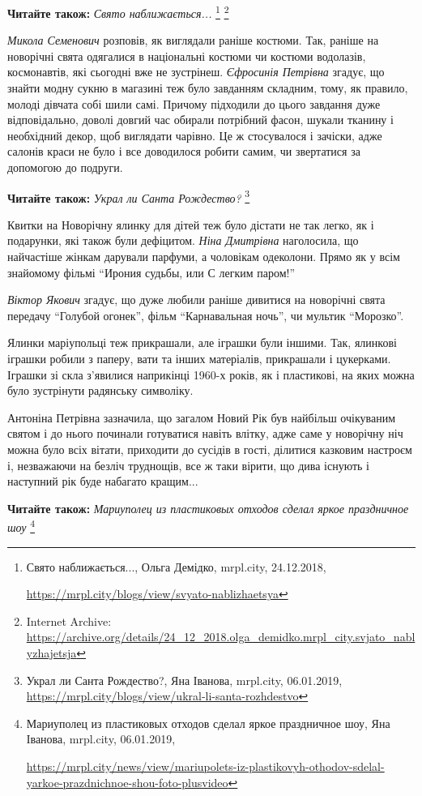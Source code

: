 
\textbf{Читайте також:} \emph{Свято наближається...}%
\footnote{Свято наближається..., Ольга Демідко, mrpl.city, 24.12.2018, \par%
\url{https://mrpl.city/blogs/view/svyato-nablizhaetsya}
} %
\footnote{Internet Archive: \url{https://archive.org/details/24_12_2018.olga_demidko.mrpl_city.svjato_nablyzhajetsja}}


\emph{Микола Семенович} розповів, як виглядали раніше костюми. Так, раніше на
новорічні свята одягалися в національні костюми чи костюми водолазів,
космонавтів, які сьогодні вже не зустрінеш. \emph{Єфросинія Петрівна} згадує, що
знайти модну сукню в магазині теж було завданням складним, тому, як правило,
молоді дівчата собі шили самі. Причому підходили до цього завдання дуже
відповідально, доволі довгий час обирали потрібний фасон, шукали тканину і
необхідний декор, щоб виглядати чарівно. Це ж стосувалося і зачіски, адже
салонів краси не було і все доводилося робити самим, чи звертатися за допомогою
до подруги.

\textbf{Читайте також:} \emph{Украл ли Санта Рождество?}%
\footnote{Украл ли Санта Рождество?, Яна Іванова, mrpl.city, 06.01.2019, \url{https://mrpl.city/blogs/view/ukral-li-santa-rozhdestvo}}

Квитки на Новорічну ялинку для дітей теж було дістати не так легко, як і
подарунки, які також були дефіцитом. \emph{Ніна Дмитрівна} наголосила, що найчастіше
жінкам дарували парфуми, а чоловікам одеколони. Прямо як у всім знайомому
фільмі \enquote{Ирония судьбы, или С легким паром!} 


\emph{Віктор Якович} згадує, що дуже любили раніше дивитися на новорічні свята
передачу \enquote{Голубой огонек}, фільм \enquote{Карнавальная ночь}, чи мультик \enquote{Морозко}.

Ялинки маріупольці теж прикрашали, але іграшки були іншими. Так, ялинкові
іграшки робили з паперу, вати та інших матеріалів, прикрашали і цукерками.
Іграшки зі скла з'явилися наприкінці 1960-х років, як і пластикові, на яких
можна було зустрінути радянську символіку.

Антоніна Петрівна зазначила, що загалом Новий Рік був найбільш очікуваним
святом і до нього починали готуватися навіть влітку, адже саме у новорічну ніч
можна було всіх вітати, приходити до сусідів в гості, ділитися казковим
настроєм і, незважаючи на безліч труднощів, все ж таки вірити, що дива існують
і наступний рік буде набагато кращим...

\textbf{Читайте також:} \emph{Мариуполец из пластиковых отходов сделал яркое праздничное шоу}%
\footnote{Мариуполец из пластиковых отходов сделал яркое праздничное шоу, Яна Іванова, mrpl.city, 06.01.2019,\par\url{https://mrpl.city/news/view/mariupolets-iz-plastikovyh-othodov-sdelal-yarkoe-prazdnichnoe-shou-foto-plusvideo}}
